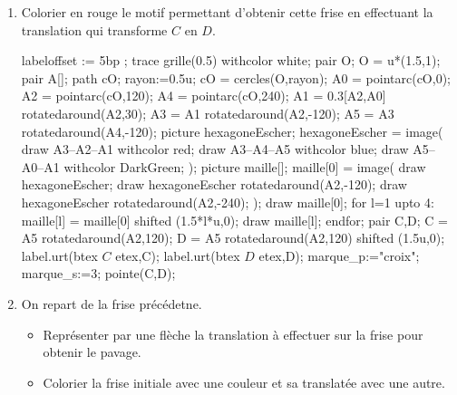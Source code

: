 \begin{exercice*}
    \begin{changemargin}{0mm}{0mm}
        \begin{enumerate}
            \item Colorier en rouge le motif permettant d'obtenir cette frise en effectuant la translation qui transforme $C$ en $D$.
            
            \hspace*{-5mm}
            \begin{Geometrie}[CoinHD={(8u,3u)}]
                labeloffset := 5bp ;
                trace grille(0.5) withcolor white;
                pair O;
                O = u*(1.5,1);
                pair A[];
                path cO;
                rayon:=0.5u;
                cO = cercles(O,rayon);
                A0 = pointarc(cO,0);
                A2 = pointarc(cO,120);
                A4 = pointarc(cO,240);
                A1 = 0.3[A2,A0] rotatedaround(A2,30);
                A3 = A1 rotatedaround(A2,-120);
                A5 = A3 rotatedaround(A4,-120);        
                picture hexagoneEscher;
                hexagoneEscher = image(
                    draw A3--A2--A1 withcolor red;        
                        draw A3--A4--A5 withcolor blue;        
                        draw A5--A0--A1 withcolor DarkGreen;
                );
                picture maille[];
                maille[0] = image(
                    draw hexagoneEscher;
                    draw hexagoneEscher rotatedaround(A2,-120);
                    draw hexagoneEscher rotatedaround(A2,-240);
                );        
                draw maille[0];
                for l=1 upto 4:
                    maille[l] = maille[0] shifted (1.5*l*u,0);
                    draw maille[l];
                endfor;
                pair C,D;
                C = A5 rotatedaround(A2,120);
                D = A5 rotatedaround(A2,120) shifted (1.5u,0);
                label.urt(btex $C$ etex,C);
                label.urt(btex $D$ etex,D);
                marque_p:="croix";
                marque_s:=3;
                pointe(C,D);
            \end{Geometrie}
            \item On repart de la frise précédetne.
            \begin{itemize}
                \item Représenter par une flèche la translation à effectuer sur la frise pour obtenir le pavage.
                \item Colorier la frise initiale avec une couleur et sa translatée avec une autre.
            \end{itemize}


\end{enumerate}
\end{changemargin}
\end{exercice*}
